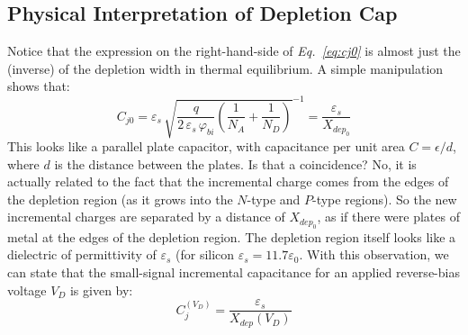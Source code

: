 \subsection{Physical Interpretation of Depletion Cap}
Notice that the expression on the right-hand-side of \emph{Eq.~\ref{eq:cj0}} is almost just the (inverse) of the depletion width in thermal equilibrium.  A simple manipulation shows that:
    \begin{equation} 
        C_{j0} = \varepsilon_s\,\sqrt{ \frac{q}{2\,\varepsilon_s\,\varphi_{bi}} \left( \frac{1}{N_A} + \frac{1}{N_D} \right) }^{-1} =
        \frac{\varepsilon_s}{X_{{dep}_0}}
    \end{equation}
This looks like a parallel plate capacitor, with capacitance per unit area $C = \epsilon/d$, where $d$ is the distance between the plates. Is that a coincidence?  No, it is actually related to the fact that the incremental charge comes from the edges of the depletion region (as it grows into the $N$-type and $P$-type regions).  So the new incremental charges are separated by a distance of $X_{{dep}_0}$, as if there were plates of metal at the edges of the depletion region.  The depletion region itself looks like a dielectric of permittivity of $\varepsilon_s$ (for silicon $\varepsilon_s = 11.7 \varepsilon_0$.  With this observation, we can state that the small-signal incremental capacitance for an applied reverse-bias voltage $V_D$ is given by:
    \begin{equation} 
        C_j^(V_D) = \frac{\varepsilon_s}{X_{dep}(V_D)} 
    \end{equation}
